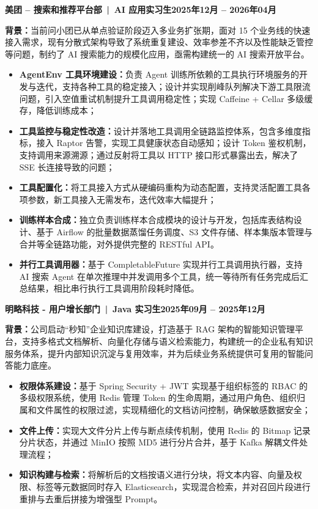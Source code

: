 \documentclass[10pt,a4paper,fontset=none]{ctexart}
\newcommand{\entryTitleFont}{\fontsize{10pt}{10.8pt}\selectfont\bfseries}
\newcommand{\bodyFont}{\fontsize{9pt}{10.8pt}\selectfont}
\newcommand{\dateFont}{\fontsize{9pt}{9pt}\selectfont}
\newcommand{\entryIndent}{0.3cm}
\newcommand{\twoSideEntry}[2]{%
  \begingroup
  \leftskip=\entryIndent
  \rightskip=\entryIndent
  \entryTitleFont
  \noindent #1\hfill{\dateFont #2}\par
  \endgroup
}
\newenvironment{resumeItems}{%
  \begin{itemize}%
}{%
  \end{itemize}%
}
\newcommand{\resumeText}[1]{
  {\bodyFont #1}
}
\newcommand{\resumeIntroText}[1]{%
  \begingroup
  \leftskip=\entryIndent
  \rightskip=\entryIndent
  \bodyFont
  \noindent #1\par
  \endgroup
}
\newcommand{\resumeItem}[1]{\item \resumeText{#1}}
\begin{document}
\twoSideEntry{美团 -- 搜索和推荐平台部 \,|\, AI 应用实习生}{2025年12月 -- 2026年04月}
\resumeIntroText{\textbf{背景：}当前问小团已从单点验证阶段迈入多业务扩张期，面对 15 个业务线的快速接入需求，现有分散式架构导致了系统重复建设、效率参差不齐以及性能缺乏管控等问题，制约了 AI 搜索能力的规模化应用，亟需构建统一的 AI 搜索开放平台。}
\begin{resumeItems}
  \resumeItem{\textbf{AgentEnv 工具环境建设：}负责 Agent 训练所依赖的工具执行环境服务的开发与迭代，支持各种工具的稳定接入；设计并实现削峰队列解决下游工具限流问题，引入空值重试机制提升工具调用稳定性；实现 Caffeine + Cellar 多级缓存，降低训练成本；}
  \resumeItem{\textbf{工具监控与稳定性改造：}设计并落地工具调用全链路监控体系，包含多维度指标，接入 Raptor 告警，实现工具健康状态自动感知；设计 Token 鉴权机制，支持调用来源溯源；通过反射将工具以 HTTP 接口形式暴露出去，解决了 SSE 长连接导致的问题；}
  \resumeItem{\textbf{工具配置化：}将工具接入方式从硬编码重构为动态配置，支持灵活配置工具各项参数，新工具接入无需发布，迭代效率大幅提升；}
  \resumeItem{\textbf{训练样本合成：}独立负责训练样本合成模块的设计与开发，包括库表结构设计、基于 Airflow 的批量数据蒸馏任务调度、S3 文件存储、样本集版本管理与合并等全链路功能，对外提供完整的 RESTful API。}
  \resumeItem{\textbf{并行工具调用器：}基于 CompletableFuture 实现并行工具调用执行器，支持 AI 搜索 Agent 在单次推理中并发调用多个工具，统一等待所有任务完成后汇总结果，相比串行执行工具调用阶段耗时降低。}
\end{resumeItems}

\twoSideEntry{明略科技 - 用户增长部门 \,|\, Java 实习生}{2025年09月 -- 2025年12月}
\resumeIntroText{\textbf{背景：}公司启动“秒知”企业知识库建设，打造基于 RAG 架构的智能知识管理平台，支持多格式文档解析、向量化存储与语义检索能力，构建统一的企业私有知识服务体系，提升内部知识沉淀与复用效率，并为后续业务系统提供可复用的智能问答能力底座。}
\begin{resumeItems}
  \resumeItem{\textbf{权限体系建设：}基于 Spring Security + JWT 实现基于组织标签的 RBAC 的多级权限系统，使用 Redis 管理 Token 的生命周期，通过用户角色、组织归属和文件属性的权限过滤，实现精细化的文档访问控制，确保敏感数据安全；}
  \resumeItem{\textbf{文件上传：}实现大文件分片上传与断点续传机制，使用 Redis 的 Bitmap 记录分片状态，并通过 MinIO 按照 MD5 进行分片合并，基于 Kafka 解耦文件处理流程；}
  \resumeItem{\textbf{知识构建与检索：}将解析后的文档按语义进行分块，将文本内容、向量及权限、标签等元数据同时存入 Elasticsearch，实现混合检索，并对召回片段进行重排与去重后拼接为增强型 Prompt。}
\end{resumeItems}
\end{document}
